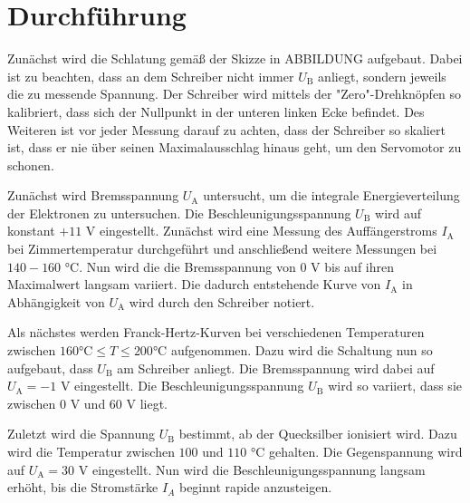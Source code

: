 \section{Durchführung}
\label{sec:Durchführung}


Zunächst wird die Schlatung gemäß der Skizze in ABBILDUNG aufgebaut. Dabei ist zu beachten, dass an dem Schreiber nicht immer $U_\text{B}$ anliegt, sondern jeweils die zu messende Spannung.
Der Schreiber wird mittels der "Zero"-Drehknöpfen so kalibriert, dass sich der Nullpunkt in der unteren linken Ecke befindet. Des Weiteren ist vor jeder Messung darauf zu achten, dass der Schreiber so skaliert ist, dass er nie über seinen Maximalausschlag hinaus geht, um den Servomotor zu schonen.

Zunächst wird Bremsspannung $U_\text{A}$ untersucht, um die integrale Energieverteilung der Elektronen zu untersuchen.
Die Beschleunigungsspannung $U_\text{B}$ wird auf konstant $+11$ V eingestellt. Zunächst wird eine Messung des Auffängerstroms $I_\text{A}$ bei Zimmertemperatur durchgeführt und anschließend weitere Messungen bei $140 - 160$ °C.
Nun wird die die Bremsspannung von 0 V bis auf ihren Maximalwert langsam variiert. Die dadurch entstehende Kurve von $I_\text{A}$ in Abhängigkeit von $U_\text{A}$ wird durch den Schreiber notiert.

Als nächstes werden Franck-Hertz-Kurven bei verschiedenen Temperaturen zwischen $160 \text{°C} \leq T \leq 200 \text{°C}$ aufgenommen. Dazu wird die Schaltung nun so aufgebaut, dass $U_\text{B}$ am Schreiber anliegt.
Die Bremsspannung wird dabei auf $U_\text{A} = -1$ V eingestellt. Die Beschleunigungsspannung $U_\text{B}$ wird so variiert, dass sie zwischen 0 V und 60 V liegt.

Zuletzt wird die Spannung $U_\text{B}$ bestimmt, ab der Quecksilber ionisiert wird. Dazu wird die Temperatur zwischen $100$ und $110$ °C gehalten. Die Gegenspannung wird auf $U_\text{A} = 30$ V eingestellt.
Nun wird die Beschleunigungsspannung langsam erhöht, bis die Stromstärke $I_A$ beginnt rapide anzusteigen.